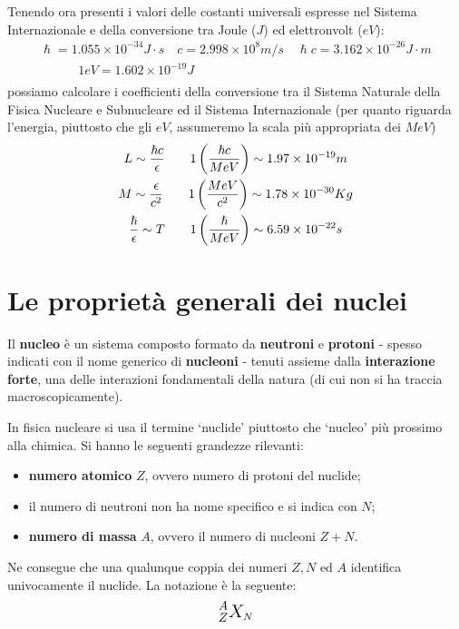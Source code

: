 Tenendo ora presenti i valori delle costanti universali espresse nel Sistema Internazionale e della conversione tra Joule
($J$) ed elettronvolt ($eV$):
\begin{gather*}
    \hslash = 1.055 \times 10^{-34} J \cdot s \quad c = 2.998 \times 10^8 m/s \quad \hslash c = 3.162 \times 10^{-26} J \cdot m\\
    \qquad \quad 1 eV = 1.602 \times 10^{-19} J\\
\end{gather*}
possiamo calcolare i coefficienti della conversione tra il Sistema Naturale della Fisica Nucleare e Subnucleare ed il Sistema Internazionale (per quanto riguarda l'energia, piuttosto che gli $eV$, assumeremo la scala più appropriata dei $MeV$)
\begin{gather*}
    L \sim \frac{\hslash c}{\epsilon} \qquad 1 \left(\frac{\hslash c}{MeV}\right) \sim 1.97      \times 10^{-19} m\\
    M \sim \frac{\epsilon}{c^2} \qquad 1 \left(\frac{MeV}{c^2}\right) \sim 1.78 \times 10^{-30} Kg\\
    \frac{\hslash}{\epsilon} \sim T \qquad 1 \left ( \frac{\hslash}{MeV} \right) \sim 6.59 \times 10^{-22} s
\end{gather*}

\section{Le proprietà generali dei nuclei}
\label{sec:proprieta-generali-dei-nuclei}

Il \textbf{nucleo} è un sistema composto formato da \textbf{neutroni} e \textbf{protoni} - spesso indicati con il nome
generico di \textbf{nucleoni} - tenuti assieme dalla \textbf{interazione forte}, una delle interazioni fondamentali
della natura (di cui non si ha traccia macroscopicamente).

In fisica nucleare si usa il termine `nuclide' piuttosto che `nucleo' più prossimo alla chimica.
Si hanno le seguenti grandezze rilevanti:
\begin{itemize}
    \item \textbf{numero atomico} $Z$, ovvero numero di protoni del nuclide;
    \item il numero di neutroni non ha nome specifico e si indica con $N$;
    \item \textbf{numero di massa} $A$, ovvero il numero di nucleoni $Z+N$.
\end{itemize}

Ne consegue che una qualunque coppia dei numeri $Z, N$ ed $A$ identifica univocamente il nuclide.
La notazione è la seguente:
\[
\mathlarger{\mathlarger{^A _{Z} X}}_N
\]

